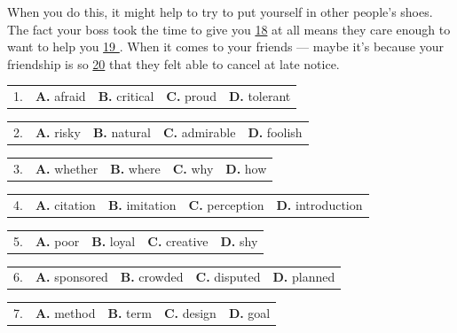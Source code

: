\documentclass[UTF8,11pt]{ctexart}
\begin{document}
When you do this, it might help to try to put yourself in other people’s shoes. The fact your boss took the time to give you \uline{18} at all means they care enough to want to help you \uline{19 }. When it comes to your friends — maybe it’s because your friendship is so \uline{20} that they felt able to cancel at late notice.


\noindent\begin{tabularx}{\linewidth}{@{}lXXXX@{}}1. & \textbf{A.} afraid & \textbf{B.} critical & \textbf{C.} proud & \textbf{D.} tolerant\\\end{tabularx}\par

\noindent\begin{tabularx}{\linewidth}{@{}lXXXX@{}}2. & \textbf{A.} risky & \textbf{B.} natural & \textbf{C.} admirable & \textbf{D.} foolish\\\end{tabularx}\par

\noindent\begin{tabularx}{\linewidth}{@{}lXXXX@{}}3. & \textbf{A.} whether & \textbf{B.} where & \textbf{C.} why & \textbf{D.} how\\\end{tabularx}\par

\noindent\begin{tabularx}{\linewidth}{@{}lXXXX@{}}4. & \textbf{A.} citation & \textbf{B.} imitation & \textbf{C.} perception & \textbf{D.} introduction\\\end{tabularx}\par

\noindent\begin{tabularx}{\linewidth}{@{}lXXXX@{}}5. & \textbf{A.} poor & \textbf{B.} loyal & \textbf{C.} creative & \textbf{D.} shy\\\end{tabularx}\par

\noindent\begin{tabularx}{\linewidth}{@{}lXXXX@{}}6. & \textbf{A.} sponsored & \textbf{B.} crowded & \textbf{C.} disputed & \textbf{D.} planned\\\end{tabularx}\par

\noindent\begin{tabularx}{\linewidth}{@{}lXXXX@{}}7. & \textbf{A.} method & \textbf{B.} term & \textbf{C.} design & \textbf{D.} goal\\\end{tabularx}\par
\end{document}
